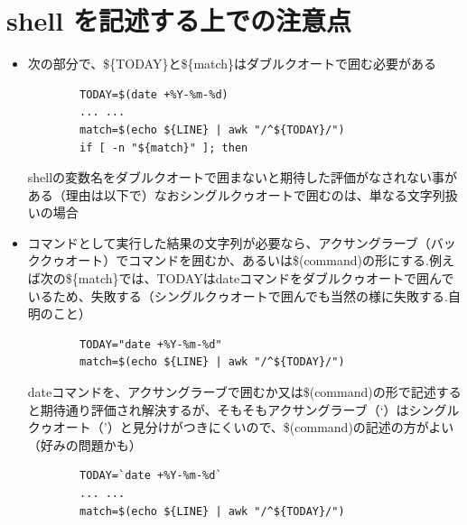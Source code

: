 \documentclass[12pt,a4paper,uplatex]{jsbook}
\begin{document}
\section{shell を記述する上での注意点}

\begin{itemize}
	\item 次の部分で、\$\{TODAY\}と\$\{match\}はダブルクオートで囲む必要がある	
	\begin{verbatim}
		TODAY=$(date +%Y-%m-%d)
		... ...
		match=$(echo ${LINE} | awk "/^${TODAY}/")
		if [ -n "${match}" ]; then
	\end{verbatim}
	shellの変数名をダブルクオートで囲まないと期待した評価がなされない事がある（理由は以下で）なおシングルクゥオートで囲むのは、単なる文字列扱いの場合
	\item コマンドとして実行した結果の文字列が必要なら、アクサングラーブ（バッククゥオート）でコマンドを囲むか、あるいは\$(command)の形にする.例えば次の\$\{match\}では、TODAYはdateコマンドをダブルクゥオートで囲んでいるため、失敗する（シングルクゥオートで囲んでも当然の様に失敗する.自明のこと）
	\begin{verbatim}
		TODAY="date +%Y-%m-%d"
		match=$(echo ${LINE} | awk "/^${TODAY}/")
	\end{verbatim}
	dateコマンドを、アクサングラーブで囲むか又は\$(command)の形で記述すると期待通り評価され解決するが、そもそもアクサングラーブ（`）はシングルクゥオート（'）と見分けがつきにくいので、\$(command)の記述の方がよい（好みの問題かも）
	\begin{verbatim}
		TODAY=`date +%Y-%m-%d`
		... ...
		match=$(echo ${LINE} | awk "/^${TODAY}/")
	\end{verbatim}
	
	

\end{itemize}
\end{document}
